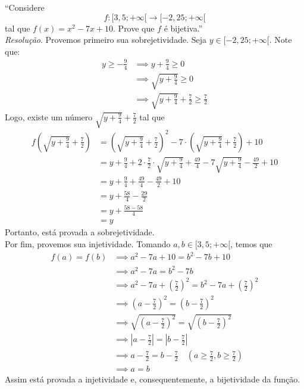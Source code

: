 \enquote{Considere 
\begin{displaymath}
    f: [3,5; +\infty[ \rightarrow  [-2,25; + \infty[
\end{displaymath}
tal que $f(x) = x^2 - 7x + 10$. Prove que $f$ é bijetiva.}
\\ \emph{Resolução}. Provemos primeiro sua sobrejetividade. Seja $y \in [-2,25; + \infty[$. Note que: 
\begin{align*}
    y \ge -\frac{9}{4} & \implies y + \frac{9}{4} \ge 0 \\ & \implies
    \sqrt{y + \frac{9}{4}} \ge 0 \\ & \implies
    \sqrt{y + \frac{9}{4}} + \frac{7}{2} \ge \frac{7}{2}
\end{align*}
Logo, existe um número $\sqrt{y + \frac{9}{4}} + \frac{7}{2}$ tal que
\begin{align*}
    f(\sqrt{y + \frac{9}{4}} + \frac{7}{2}) & = (\sqrt{y + \frac{9}{4}} + \frac{7}{2})^2 - 7 \cdot (\sqrt{y + \frac{9}{4}} + \frac{7}{2}) + 10 \\ & =
    y + \frac{9}{4} + 2\cdot\frac{7}{2}\cdot \sqrt{y + \frac{9}{4}} + \frac{49}{4} -7\sqrt{y + \frac{9}{4}} - \frac{49}{2} + 10 \\ & =
    y + \frac{9}{4} + \frac{49}{4} - \frac{49}{2} + 10 \\ & =
    y + \frac{58}{4} - \frac{29}{2} \\ & =
    y + \frac{58 - 58}{4} \\ & =
    y
\end{align*}
Portanto, está provada a sobrejetividade. \\
Por fim, provemos sua injetividade. Tomando $a, b \in [3,5; +\infty[$, temos que
\begin{align*}
    f(a) = f(b) & \implies a^2 - 7a + 10 = b^2 - 7b + 10 \\ & \implies
    a^2 - 7a = b^2 - 7b \\ & \implies
    a^2 - 7a + (\frac{7}{2})^2 = b^2 - 7a + (\frac{7}{2})^2 \\ & \implies
    (a - \frac{7}{2})^2 = (b - \frac{7}{2})^2 \\ & \implies
    \sqrt{(a - \frac{7}{2})^2} = \sqrt{(b - \frac{7}{2})^2} \\ & \implies
    |a - \frac{7}{2}| = |b - \frac{7}{2}| \\ & \implies
    a - \frac{7}{2} = b - \frac{7}{2} \quad (a \ge \frac{7}{2}, b \ge \frac{7}{2}) \\ & \implies
    a = b
\end{align*}
Assim está provada a injetividade e, consequentemente, a bijetividade da função.
